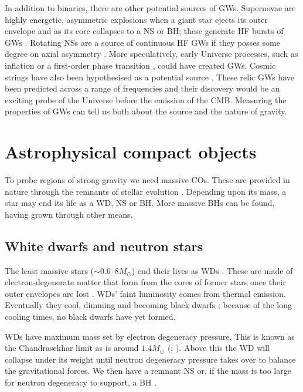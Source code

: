 In addition to binaries, there are other potential sources of GWs. Supernovae are highly energetic, asymmetric explosions when a giant star ejects its outer envelope and as its core collapses to a NS or BH; these generate HF bursts of GWs \citep{Dimmelmeier2002,Kotake2006}. Rotating NSs are a source of continuous HF GWs if they posses some degree on axial asymmetry \citep{Abbott2007,Prix2009}. More speculatively, early Universe processes, such as inflation \citep{Grishchuk2005} or a first-order phase transition \citep{Binetruy2012}, could have created GWs. Cosmic strings have also been hypothesised as a potential source \citep{Damour2005,Binetruy2012}. These relic GWs have been predicted across a range of frequencies and their discovery would be an exciting probe of the Universe before the emission of the CMB. Measuring the properties of GWs can tell us both about the source and the nature of gravity.

\section{Astrophysical compact objects}

To probe regions of strong gravity we need massive COs. These are provided in nature through the remnants of stellar evolution \citep[section 1.1]{Shapiro1983}. Depending upon its mass, a star may end its life as a WD, NS or BH. More massive BHs can be found, having grown through other means.

\subsection{White dwarfs and neutron stars}

The least massive stars ($\sim0.6$--$8M_\odot$) end their lives as WDs \citep{Poelarends2008}. These are made of electron-degenerate matter that form from the cores of former stars once their outer envelopes are lost \citep{Althaus2010}. WDs' faint luminosity comes from thermal emission. Eventually they cool, dimming and becoming black dwarfs \citep[section 4.2]{Shapiro1983}; because of the long cooling times, no black dwarfs have yet formed.

WDs have maximum mass set by electron degeneracy pressure. This is known as the Chandrasekhar limit as is around $1.4 M_\odot$ (\citealt[section 3.4]{Shapiro1983}; \citealt{Nomoto1987,Timmes1996}).%
 Above this the WD will collapse under its weight until neutron degeneracy pressure takes over to balance the gravitational forces. We then have a remnant NS or, if the mass is too large for neutron degeneracy to support, a BH \citep{Woosley2002,Langer2012}.

